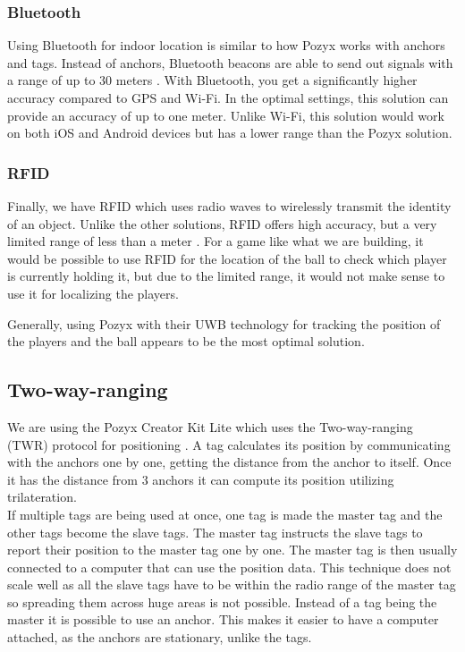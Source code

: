 \subsubsection{Bluetooth}
Using Bluetooth for indoor location is similar to how Pozyx works with anchors and tags.
Instead of anchors, Bluetooth beacons are able to send out signals with a range of up to 30 meters \cite{infsoft:bluetooth}.
With Bluetooth, you get a significantly higher accuracy compared to GPS and Wi-Fi.
In the optimal settings, this solution can provide an accuracy of up to one meter.
Unlike Wi-Fi, this solution would work on both iOS and Android devices but has a lower range than the Pozyx solution.

\subsubsection{RFID}
Finally, we have RFID which uses radio waves to wirelessly transmit the identity of an object.
Unlike the other solutions, RFID offers high accuracy, but a very limited range of less than a meter \cite{infsoft:rfid}.
For a game like what we are building, it would be possible to use RFID for the location of the ball to check which player is currently holding it, but due to the limited range, it would not make sense to use it for localizing the players.

Generally, using Pozyx with their UWB technology for tracking the position of the players and the ball appears to be the most optimal solution.

\subsection{Two-way-ranging}
We are using the Pozyx Creator Kit Lite which uses the Two-way-ranging (TWR) protocol for positioning \cite{pozyx-Positioning}.
A tag calculates its position by communicating with the anchors one by one, getting the distance from the anchor to itself.
Once it has the distance from 3 anchors it can compute its position utilizing trilateration.
\\
If multiple tags are being used at once, one tag is made the master tag and the other tags become the slave tags.
The master tag instructs the slave tags to report their position to the master tag one by one.
The master tag is then usually connected to a computer that can use the position data.
This technique does not scale well as all the slave tags have to be within the radio range of the master tag so spreading them across huge areas is not possible.
Instead of a tag being the master it is possible to use an anchor.
This makes it easier to have a computer attached, as the anchors are stationary, unlike the tags.
